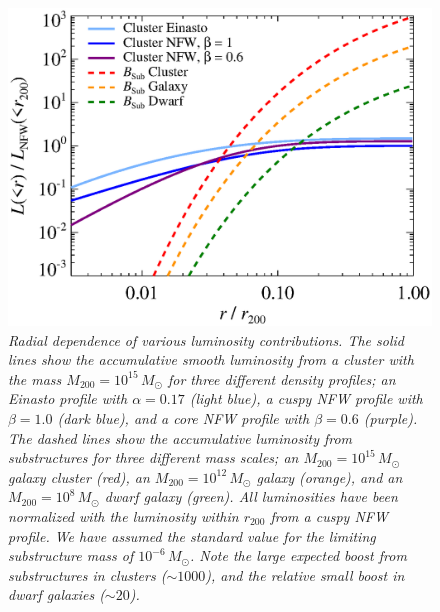 \documentclass[10pt,aps,pra,reprint,amsmath,amsfonts,amssymb,showpacs]{revtex4-1}
\newcommand{\msun}{M_\odot}
\newcommand{\rvir}{r_{200}}
\newcommand{\mvir}{M_{200}}
\begin{document}
\begin{figure}%
 \includegraphics[width=0.99\columnwidth]{figures/dens.prof.eps}
\caption{\it Radial dependence of various luminosity
  contributions. The solid lines show the accumulative smooth
  luminosity from a cluster with the mass $\mvir=10^{15}\,\msun$ for
  three different density profiles; an Einasto profile with
  $\alpha=0.17$ (light blue), a cuspy NFW profile with $\beta=1.0$
  (dark blue), and a core NFW profile with $\beta=0.6$ (purple). The
  dashed lines show the accumulative luminosity from substructures for
  three different mass scales; an $\mvir=10^{15}\,\msun$ galaxy
  cluster (red), an $\mvir=10^{12}\,\msun$ galaxy (orange), and an
  $\mvir=10^{8}\,\msun$ dwarf galaxy (green). All luminosities have
  been normalized with the luminosity within $\rvir$ from a cuspy NFW
  profile. We have assumed the standard value for the limiting
  substructure mass of $10^{-6}\,\msun$. Note the large expected
  boost from substructures in clusters ($\sim1000$), and the relative
  small boost in dwarf galaxies ($\sim20$).}
 \label{fig:radial_lum}
\end{figure}
\end{document}
